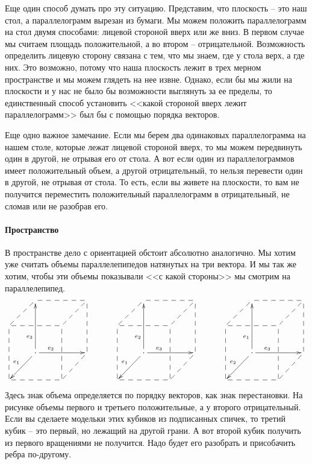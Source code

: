 Еще один способ думать про эту ситуацию.
Представим, что плоскость -- это наш стол, а параллелограмм вырезан из бумаги.
Мы можем положить параллелограмм на стол двумя способами: лицевой стороной вверх или же вниз.
В первом случае мы считаем площадь положительной, а во втором -- отрицательной.
Возможность определить лицевую сторону связана с тем, что мы знаем, где у стола верх, а где них.
Это возможно, потому что наша плоскость лежит в трех мерном пространстве и мы можем глядеть на нее извне.
Однако, если бы мы жили на плоскости и у нас не было бы возможности выглянуть за ее пределы, то единственный способ установить <<какой стороной вверх лежит параллелограмм>> был бы с помощью порядка векторов.

Еще одно важное замечание.
Если мы берем два одинаковых параллелограмма на нашем столе, которые лежат лицевой стороной вверх, то мы можем передвинуть один в другой, не отрывая его от стола.
А вот если один из параллелограммов имеет положительный объем, а другой отрицательный, то нельзя перевести один в другой, не отрывая от стола.
То есть, если вы живете на плоскости, то вам не получится переместить положительный параллелограмм в отрицательный, не сломав или не разобрав его.

\paragraph{Пространство}

В пространстве дело с ориентацией обстоит абсолютно аналогично.
Мы хотим уже считать объемы параллелепипедов натянутых на три вектора.
И мы так же хотим, чтобы эти объемы показывали <<с какой стороны>> мы смотрим на параллелепипед.
\[
\xymatrix{
	{}&{}\ar@{--}[rr]\ar@{--}[dl]&{}&{}\ar@{--}[dl]\\
	{}\ar@{--}[rr]&{}&{}&{}\\
	{}&{\cdot}\ar[uu]^(.3){e_3}\ar[rr]^(.3){e_2}\ar[dl]_{e_1}&{}&{}\ar@{--}[dl]\ar@{--}[uu]\\
	{}\ar@{--}[rr]\ar@{--}[uu]&{}&{}\ar@{--}[uu]&{}\\
}
\quad\quad\quad
\xymatrix{
	{}&{}\ar@{--}[rr]\ar@{--}[dl]&{}&{}\ar@{--}[dl]\\
	{}\ar@{--}[rr]&{}&{}&{}\\
	{}&{\cdot}\ar[uu]^(.3){e_2}\ar[rr]^(.3){e_3}\ar[dl]_{e_1}&{}&{}\ar@{--}[dl]\ar@{--}[uu]\\
	{}\ar@{--}[rr]\ar@{--}[uu]&{}&{}\ar@{--}[uu]&{}\\
}
\quad\quad\quad
\xymatrix{
	{}&{}\ar@{--}[rr]\ar@{--}[dl]&{}&{}\ar@{--}[dl]\\
	{}\ar@{--}[rr]&{}&{}&{}\\
	{}&{\cdot}\ar[uu]^(.3){e_1}\ar[rr]^(.3){e_3}\ar[dl]_{e_2}&{}&{}\ar@{--}[dl]\ar@{--}[uu]\\
	{}\ar@{--}[rr]\ar@{--}[uu]&{}&{}\ar@{--}[uu]&{}\\
}
\]
Здесь знак объема определяется по порядку векторов, как знак перестановки.
На рисунке объемы первого и третьего положительные, а у второго отрицательный.
Если вы сделаете модельки этих кубиков из подписанных спичек, то третий кубик -- это первый, но лежащий на другой грани.
А вот второй кубик получить из первого вращениями не получится.
Надо будет его разобрать и присобачить ребра по-другому. 

